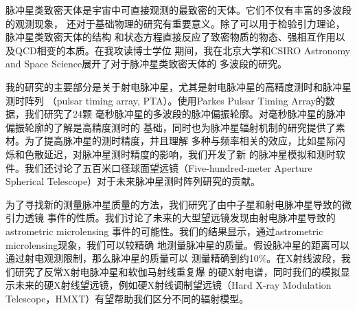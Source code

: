 
\begin{cabstract}

脉冲星类致密天体是宇宙中可直接观测的最致密的天体。它们不仅有丰富的多波段的观测现象，
还对于基础物理的研究有重要意义。除了可以用于检验引力理论，脉冲星类致密天体的结构
和状态方程直接反应了致密物质的物态、强相互作用以及QCD相变的本质。在我攻读博士学位
期间，我在北京大学和CSIRO Astronomy and Space Science展开了对于脉冲星类致密天体的
多波段的研究。

我的研究的主要部分是关于射电脉冲星，尤其是射电脉冲星的高精度测时和脉冲星测时阵列
（pulsar timing array, PTA）。使用Parkes Pulsar Timing Array的数据，我们研究了24颗
毫秒脉冲星的多波段的脉冲偏振轮廓。对毫秒脉冲星的脉冲偏振轮廓的了解是高精度测时的
基础，同时也为脉冲星辐射机制的研究提供了素材。为了提高脉冲星的测时精度，并且理解
多种与频率相关的效应，比如星际闪烁和色散延迟，对脉冲星测时精度的影响，我们开发了新
的脉冲星模拟和测时软件。我们还讨论了五百米口径球面望远镜（Five-hundred-meter Aperture 
Spherical Telescope）对于未来脉冲星测时阵列研究的贡献。

为了寻找新的测量脉冲星质量的方法，我们研究了由中子星和射电脉冲星导致的微引力透镜
事件的性质。我们讨论了未来的大型望远镜发现由射电脉冲星导致的astrometric microlensing
事件的可能性。我们的结果显示，通过astrometric microlensing现象，我们可以较精确
地测量脉冲星的质量。假设脉冲星的距离可以通过射电观测限制，那么脉冲星的质量可以
测量精确到约10\%。在X射线波段，我们研究了反常X射电脉冲星和软伽马射线重复爆
的硬X射电谱，同时我们的模拟显示未来的硬X射线望远镜，例如硬X射线调制望远镜（Hard 
X-ray Modulation Telescope，HMXT）有望帮助我们区分不同的辐射模型。
	\pkuthssffaq
\end{cabstract}

